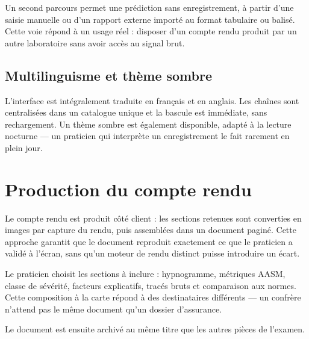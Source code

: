 Un second parcours permet une prédiction sans enregistrement, à partir d'une saisie
manuelle ou d'un rapport externe importé au format tabulaire ou balisé. Cette voie
répond à un usage réel : disposer d'un compte rendu produit par un autre laboratoire
sans avoir accès au signal brut.


\subsection{Multilinguisme et thème sombre}

L'interface est intégralement traduite en français et en anglais. Les chaînes sont
centralisées dans un catalogue unique et la bascule est immédiate, sans rechargement.
Un thème sombre est également disponible, adapté à la lecture nocturne — un praticien
qui interprète un enregistrement le fait rarement en plein jour.


\section{Production du compte rendu}

Le compte rendu est produit côté client : les sections retenues sont converties en
images par capture du rendu, puis assemblées dans un document paginé. Cette approche
garantit que le document reproduit exactement ce que le praticien a validé à l'écran,
sans qu'un moteur de rendu distinct puisse introduire un écart.

Le praticien choisit les sections à inclure : hypnogramme, métriques AASM, classe de
sévérité, facteurs explicatifs, tracés bruts et comparaison aux normes. Cette
composition à la carte répond à des destinataires différents — un confrère n'attend pas
le même document qu'un dossier d'assurance.

Le document est ensuite archivé au même titre que les autres pièces de l'examen.


